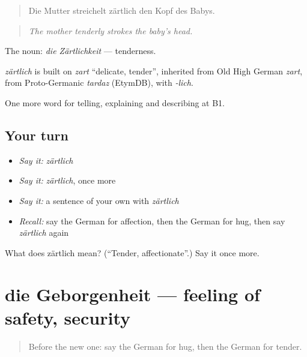 \begin{quote}
Die Mutter streichelt zärtlich den Kopf des Babys.
\end{quote}

\begin{quote}
\emph{The mother tenderly strokes the baby's head.}
\end{quote}

The noun: \emph{die Zärtlichkeit} — tenderness.

\begin{cousinweb}
\emph{zärtlich} is built on \emph{zart} \textquotedblleft{}delicate, tender\textquotedblright{}, inherited from Old High German \emph{zart}, from Proto-Germanic \emph{tardaz} (EtymDB), with \emph{-lich}.
\end{cousinweb}

\begin{grammarlens}[title={What you've built}]
One more word for telling, explaining and describing at B1.
\end{grammarlens}

\subsection*{Your turn}
\begin{itemize}
\raggedright
  \item \emph{Say it:} \emph{zärtlich}
  \item \emph{Say it:} \emph{zärtlich}, once more
  \item \emph{Say it:} a sentence of your own with \emph{zärtlich}
  \item \emph{Recall:} say the German for affection, then the German for hug, then say \emph{zärtlich} again
\end{itemize}

\begin{tcolorbox}[breakable,colback=teal!4,colframe=teal!35!black,title={Before you move on}]
What does zärtlich mean? (\textquotedblleft{}Tender, affectionate\textquotedblright{}.) Say it once more.
\end{tcolorbox}
\section[die Geborgenheit]{die Geborgenheit — feeling of safety, security}

\label{lesson:GE-C493-geborgenheit}



\begin{quote}
Before the new one: say the German for hug, then the German for tender.
\end{quote}

